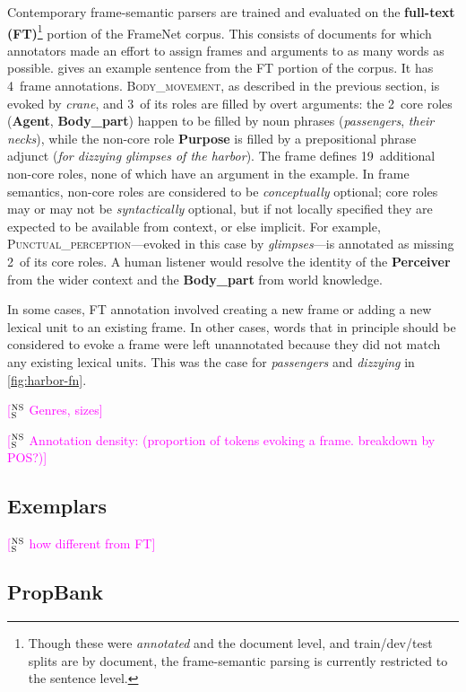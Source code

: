 \documentclass[11pt,a4paper]{article}
\newcommand{\ensuretext}[1]{#1}
\newcommand{\nssmarker}{\ensuretext{\textcolor{magenta}{\ensuremath{^{\textsc{NS}}_{\textsc{S}}}}}}
\newcommand{\arkcomment}[3]{\ensuretext{\textcolor{#3}{[#1 #2]}}}
\newcommand{\nss}[1]{\arkcomment{\nssmarker}{#1}{magenta}}
\newcommand{\fnf}[1]{\textsc{\textsf{#1}}} %
\newcommand{\fnr}[1]{\textbf{\textsf{#1}}} %
\begin{document}
Contemporary frame-semantic parsers are trained and evaluated on the \textbf{full-text (FT)}\footnote{Though these 
were \emph{annotated} and the document level, and train/dev/test splits are by document, the frame-semantic parsing 
is currently restricted to the sentence level.} portion 
of the FrameNet corpus. This consists of documents for which annotators made an effort 
to assign frames and arguments to as many words as possible. 
 gives an example sentence from the FT portion of the corpus. 
It has 4~frame annotations. \fnf{Body\_movement}, as described in the previous section, 
is evoked by \textit{crane}, and 3~of its roles are filled by overt arguments: 
the 2~core roles (\fnr{Agent}, \fnr{Body\_part}) happen to be filled by noun phrases 
(\textit{passengers}, \textit{their necks}), while the non-core role \fnr{Purpose} is filled by a 
prepositional phrase adjunct (\textit{for dizzying glimpses of the harbor}).
The frame defines 19~additional non-core roles, none of which have an argument in the example.
In frame semantics, non-core roles are considered to be \emph{conceptually} optional; 
core roles may or may not be \emph{syntactically} optional, but if not locally specified they are 
expected to be available from context, or else implicit.
For example, \fnf{Punctual\_perception}---evoked in this case by \textit{glimpses}---is annotated 
as missing 2~of its core roles. A human listener would resolve the identity of the \fnr{Perceiver} 
from the wider context and the \fnr{Body\_part} from world knowledge. 

In some cases, FT annotation involved creating a new frame or adding a new lexical unit to an existing frame. 
In other cases, words that in principle should be considered to evoke a frame were left unannotated 
because they did not match any existing lexical units. 
This was the case for \textit{passengers} and \textit{dizzying} in \cref{fig:harbor-fn}.

\nss{Genres, sizes}

\nss{Annotation density: (proportion of tokens evoking a frame. breakdown by POS?)}

\subsection{Exemplars}\label{sec:exemplars}

\nss{how different from FT}

\subsection{PropBank}\label{sec:pb}
\end{document}
